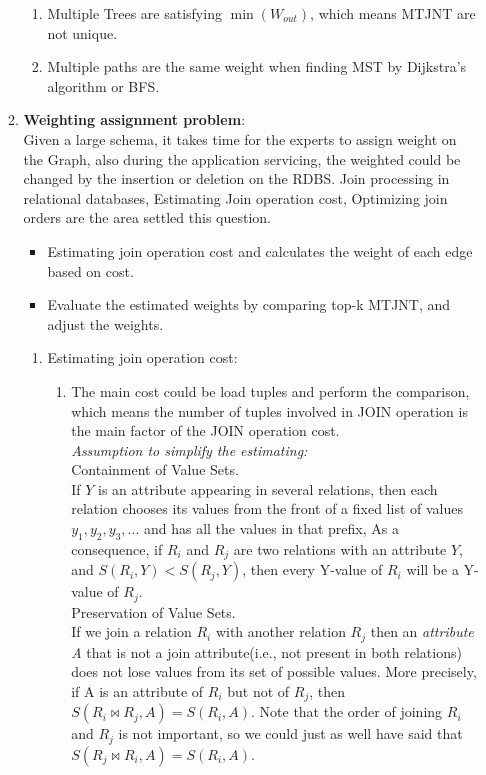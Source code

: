\begin{enumerate}
\begin{enumerate}
  \begin{enumerate} 
  \item Multiple Trees are satisfying $\min(W_{out})$, which means MTJNT are not unique.
  \item Multiple paths are the same weight when finding MST by Dijkstra's algorithm or BFS.
  \end{enumerate}
\item {\bf Weighting assignment problem}: \\
Given a large schema, it takes time for the experts to assign weight on the Graph, also during the application servicing, the weighted could be changed by the insertion or deletion on the RDBS. Join processing in relational databases, Estimating Join operation cost, Optimizing join orders are the area settled this question. 
  \begin{itemize}
  \item Estimating join operation cost and calculates the weight of each edge based on cost.
  \item Evaluate the estimated weights by comparing top-k MTJNT, and adjust the weights.
  \end{itemize}
  \begin{enumerate}
  \item Estimating join operation cost: 
    \begin{enumerate}
    \item The main cost could be load tuples and perform the comparison, which means the number of tuples involved in JOIN operation is the main factor of the JOIN operation cost.\\

     {\it Assumption to simplify the estimating:}\\

       Containment of Value Sets. \\
       If $Y$ is an attribute appearing in several relations, then each relation chooses its values from the front of a fixed list of values $y_1, y_2, y_3, ...$ and has all the values in that prefix, As a consequence, if $R_i$ and $R_j$ are two relations with an attribute $Y$, and $S(R_i,Y) < S(R_j, Y)$, then every Y-value of $R_i$ will be a Y-value of $R_j$.\\

       Preservation of Value Sets. \\
       If we join a relation $R_i$ with another relation $R_j$ then an {\it attribute A} that is not a join attribute(i.e., not present in both relations) does not lose values from its set of possible values. More precisely, if A is an attribute of $R_i$ but not of $R_j$, then $S(R_i \Join R_j, A) = S(R_i, A)$. Note that the order of joining $R_i$ and $R_j$ is not important, so we could just as well have said that $S(R_j \Join R_i, A) = S(R_i, A)$.


\end{enumerate}
\end{enumerate}
\end{enumerate}
\end{enumerate}

